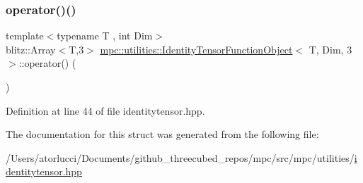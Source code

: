 \subsubsection{\texorpdfstring{operator()()}{operator()()}}
{\footnotesize\ttfamily template$<$typename T , int Dim$>$ \\
blitz\+::\+Array$<$T,3$>$ \mbox{\hyperlink{structmpc_1_1utilities_1_1_identity_tensor_function_object}{mpc\+::utilities\+::\+Identity\+Tensor\+Function\+Object}}$<$ T, Dim, 3 $>$\+::operator() (\begin{DoxyParamCaption}{ }\end{DoxyParamCaption})\hspace{0.3cm}{\ttfamily [inline]}}



Definition at line 44 of file identitytensor.\+hpp.



The documentation for this struct was generated from the following file\+:\begin{DoxyCompactItemize}
\item 
/\+Users/atorlucci/\+Documents/github\+\_\+threecubed\+\_\+repos/mpc/src/mpc/utilities/\mbox{\hyperlink{identitytensor_8hpp}{identitytensor.\+hpp}}\end{DoxyCompactItemize}
